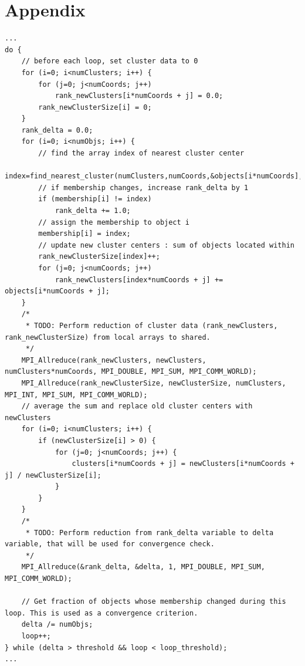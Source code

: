 \documentclass{article}
\begin{document}
\section{Appendix} %
\begin{lstlisting}[caption={Kmeans MPI}, style=CStyle, label={lst:mpi-kmeans}]
...
do {
    // before each loop, set cluster data to 0
    for (i=0; i<numClusters; i++) {
        for (j=0; j<numCoords; j++)
            rank_newClusters[i*numCoords + j] = 0.0;
        rank_newClusterSize[i] = 0;
    }
    rank_delta = 0.0;
    for (i=0; i<numObjs; i++) {
        // find the array index of nearest cluster center 
        index=find_nearest_cluster(numClusters,numCoords,&objects[i*numCoords],clusters);
        // if membership changes, increase rank_delta by 1 
        if (membership[i] != index)
            rank_delta += 1.0;
        // assign the membership to object i 
        membership[i] = index;
        // update new cluster centers : sum of objects located within
        rank_newClusterSize[index]++;
        for (j=0; j<numCoords; j++)
            rank_newClusters[index*numCoords + j] += objects[i*numCoords + j]; 
    }
    /*
     * TODO: Perform reduction of cluster data (rank_newClusters, rank_newClusterSize) from local arrays to shared.
     */
    MPI_Allreduce(rank_newClusters, newClusters, numClusters*numCoords, MPI_DOUBLE, MPI_SUM, MPI_COMM_WORLD);
    MPI_Allreduce(rank_newClusterSize, newClusterSize, numClusters, MPI_INT, MPI_SUM, MPI_COMM_WORLD);
    // average the sum and replace old cluster centers with newClusters
    for (i=0; i<numClusters; i++) {
        if (newClusterSize[i] > 0) {
            for (j=0; j<numCoords; j++) {
                clusters[i*numCoords + j] = newClusters[i*numCoords + j] / newClusterSize[i];
            }
        }
    }
    /*  
     * TODO: Perform reduction from rank_delta variable to delta variable, that will be used for convergence check.
     */
    MPI_Allreduce(&rank_delta, &delta, 1, MPI_DOUBLE, MPI_SUM, MPI_COMM_WORLD);

    // Get fraction of objects whose membership changed during this loop. This is used as a convergence criterion.
    delta /= numObjs;
    loop++;
} while (delta > threshold && loop < loop_threshold);
...
\end{lstlisting}
\end{document}
